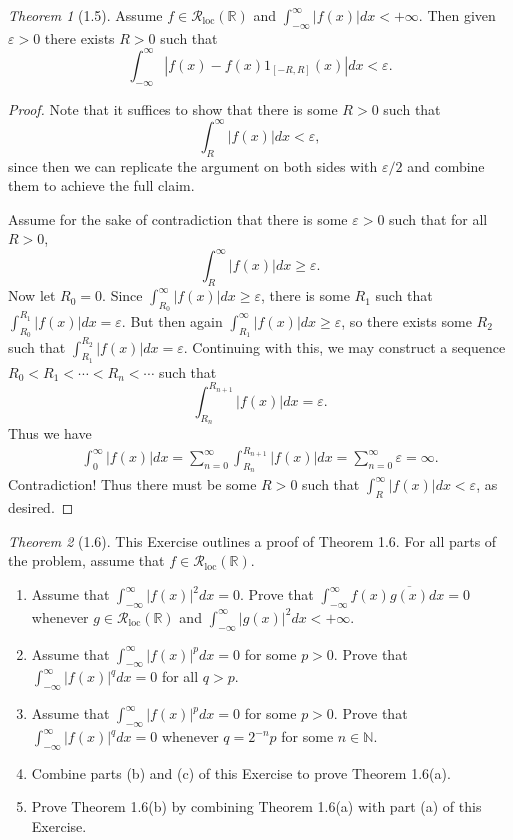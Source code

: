 \documentclass[12pt]{article}
\theoremstyle{remark}
\theoremstyle{named}
\newtheorem*{theorem}{Theorem}
\newcommand{\e}{\varepsilon}
\newcommand{\N}{\mathbb N}
\newcommand{\R}{\mathbb R}
\newcommand{\Rloc}{\mathcal R_{\text{loc}}}
\begin{document}
\begin{theorem}[1.5]
    Assume \(f \in \Rloc(\R)\) and \(\int_{-\infty}^{\infty} |f(x)| dx < + \infty\). Then given \(\e > 0\) there exists \(R > 0\) such that 
    \[\int_{-\infty}^{\infty} |f(x) - f(x) 1_{[-R, R]}(x)| dx < \e.\]
\end{theorem}

\begin{proof}
    Note that it suffices to show that there is some \(R > 0\) such that
    \[\int_{R}^{\infty} |f(x)| dx < \e,\]
    since then we can replicate the argument on both sides with \(\e / 2\) and combine them to achieve the full claim.

    Assume for the sake of contradiction that there is some \(\e > 0\) such that for all \(R > 0\), 
    \[\int_{R}^{\infty} |f(x)| dx \geq \e.\]
    Now let \(R_0 = 0\). Since \(\int_{R_0}^{\infty} |f(x)| dx \geq \e\), there is some \(R_1\) such that \(\int_{R_0}^{R_1} |f(x)| dx = \e\). But then again \(\int_{R_1}^{\infty} |f(x)| dx \geq \e\), so there exists some \(R_2\) such that \(\int_{R_1}^{R_2} |f(x)| dx = \e\). Continuing with this, we may construct a sequence \(R_0 < R_1 < \cdots < R_n < \cdots\) such that 
    \[\int_{R_n}^{R_{n + 1}} |f(x)| dx = \e.\]
    Thus we have
    \begin{align*}
        \int_{0}^{\infty} |f(x)| dx = \sum_{n = 0}^\infty \int_{R_n}^{R_{n + 1}} |f(x)| dx  = \sum_{n = 0}^\infty \e = \infty.
    \end{align*}
    Contradiction! Thus there must be some \(R > 0\) such that \(\int_{R}^{\infty} |f(x)| dx < \e\), as desired.
\end{proof}

\begin{theorem}[1.6]
    This Exercise outlines a proof of Theorem 1.6. For all parts of the problem, assume that \(f \in \Rloc(\R)\).
    \begin{enumerate}
        \item Assume that \(\int_{-\infty}^{\infty}|f(x)|^2 dx = 0\). Prove that \(\int_{-\infty}^{\infty} f(x) \overline{g(x)} dx = 0\) whenever \(g \in \Rloc(\R)\) and \(\int_{-\infty}^{\infty}|g(x)|^2 dx < + \infty\).
        \item Assume that \(\int_{-\infty}^{\infty}|f(x)|^p dx = 0\) for some \(p > 0\). Prove that \(\int_{-\infty}^{\infty}|f(x)|^q dx = 0\) for all \(q > p\). 
        \item Assume that \(\int_{-\infty}^{\infty}|f(x)|^p dx = 0\) for some \(p > 0\). Prove that \(\int_{-\infty}^{\infty}|f(x)|^q dx = 0\) whenever \(q = 2^{-n}p\) for some \(n \in \N\).
        \item Combine parts (b) and (c) of this Exercise to prove Theorem 1.6(a).
        \item Prove Theorem 1.6(b) by combining Theorem 1.6(a) with part (a) of this Exercise.
    \end{enumerate}
\end{theorem}
\end{document}
